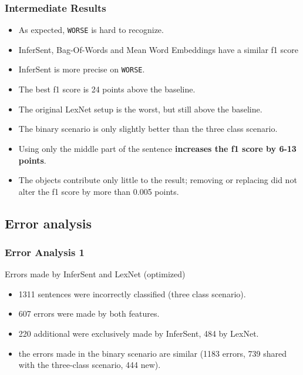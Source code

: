 \documentclass[11pt,aspectratio=169,usenames,dvipsnames]{beamer}
\begin{document}
    \begin{frame}[t]
        \frametitle{Intermediate Results}
        \begin{itemize}
            \item As expected, \texttt{WORSE} is hard to recognize.
            \item InferSent, Bag-Of-Words and Mean Word Embeddings have a similar f1 score
            \item InferSent is more precise on \texttt{WORSE}.\pause
            \item The best f1 score is 24 points above the baseline.
            \item The original LexNet setup is the worst, but still above the baseline.
            \item The binary scenario is only slightly better than the three class scenario.\pause
            \item Using only the middle part of the sentence \textbf{increases the f1 score by 6-13 points}.
            \item The objects contribute only little to the result; removing or replacing did not alter the f1 score by more than 0.005 points.
        \end{itemize}
    \end{frame}

    \subsection{Error analysis}
    \begin{frame}[t]
        \frametitle{Error Analysis 1}
        Errors made by InferSent and LexNet (optimized)
        \begin{itemize}
            \item<1> 1311 sentences were incorrectly classified (three class scenario).
            \item<1> 607 errors were made by both features.
            \item<1> 220 additional were exclusively made by InferSent, 484 by LexNet.
            \item<1> the errors made in the binary scenario are similar (1183 errors, 739 shared with the three-class scenario, 444 new).
           
        \end{itemize}

    \end{frame}
    
\end{document}
